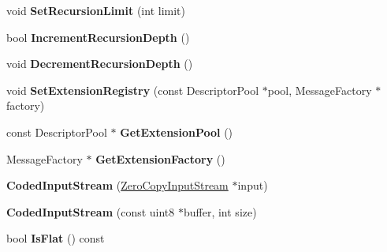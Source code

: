 \begin{DoxyCompactItemize}
void {\bfseries Set\+Recursion\+Limit} (int limit)
\item 
\mbox{\label{classgoogle_1_1protobuf_1_1io_1_1CodedInputStream_aa378da875bec7f2a1c9e09a9d37f3672}} 
bool {\bfseries Increment\+Recursion\+Depth} ()
\item 
\mbox{\label{classgoogle_1_1protobuf_1_1io_1_1CodedInputStream_aabc8f94b211fcf84fa2fdea15777d481}} 
void {\bfseries Decrement\+Recursion\+Depth} ()
\item 
\mbox{\label{classgoogle_1_1protobuf_1_1io_1_1CodedInputStream_a41c67ddbefe2d3911bdc921a1b9d4635}} 
void {\bfseries Set\+Extension\+Registry} (const Descriptor\+Pool $\ast$pool, Message\+Factory $\ast$factory)
\item 
\mbox{\label{classgoogle_1_1protobuf_1_1io_1_1CodedInputStream_a88b5d3408ad0b04aa80ee36cd4094e86}} 
const Descriptor\+Pool $\ast$ {\bfseries Get\+Extension\+Pool} ()
\item 
\mbox{\label{classgoogle_1_1protobuf_1_1io_1_1CodedInputStream_aaaf8e40304eaf6ffa91023cbed99d490}} 
Message\+Factory $\ast$ {\bfseries Get\+Extension\+Factory} ()
\item 
\mbox{\label{classgoogle_1_1protobuf_1_1io_1_1CodedInputStream_a44a83ea1cbf89fd06903cdc3add13b7e}} 
{\bfseries Coded\+Input\+Stream} (\hyperlink{classgoogle_1_1protobuf_1_1io_1_1ZeroCopyInputStream}{Zero\+Copy\+Input\+Stream} $\ast$input)
\item 
\mbox{\label{classgoogle_1_1protobuf_1_1io_1_1CodedInputStream_aa6d951813fcfdf5d92f35bb95f806420}} 
{\bfseries Coded\+Input\+Stream} (const uint8 $\ast$buffer, int size)
\item 
\mbox{\label{classgoogle_1_1protobuf_1_1io_1_1CodedInputStream_aa4cc302ec290bf45355c22f31cad35e6}} 
bool {\bfseries Is\+Flat} () const
\item 

\end{DoxyCompactItemize}
